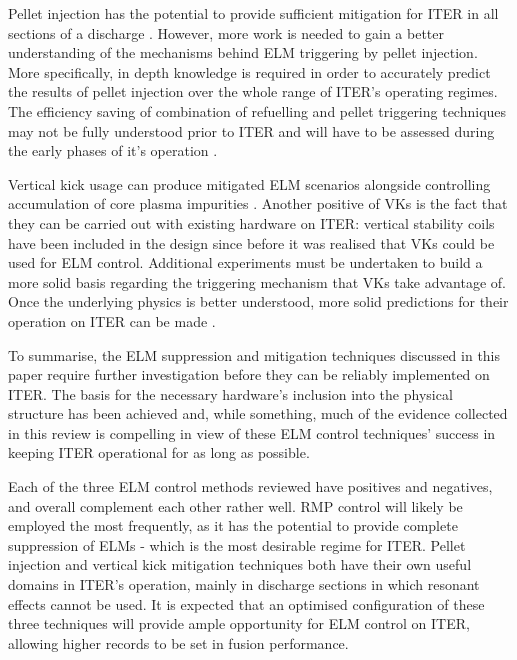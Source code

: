 \documentclass[11pt, twocolumn]{article}  %
\newcommand{\citep}[1]{\cite{#1}}
\begin{document}
Pellet injection has the potential to provide sufficient mitigation for ITER in all sections of a discharge \citep{Baylor2015}. However, more work is needed to gain a better understanding of the mechanisms behind ELM triggering by pellet injection. More specifically, in depth knowledge is required in order to accurately predict the results of pellet injection over the whole range of ITER's operating regimes. The efficiency saving of combination of refuelling and pellet triggering techniques may not be fully understood prior to ITER and will have to be assessed during the early phases of it's operation \citep{Baylor2015}.

Vertical kick usage can produce mitigated ELM scenarios alongside controlling accumulation of core plasma impurities \cite{DelaLuna2016}. Another positive of VKs is the fact that they can be carried out with existing hardware on ITER: vertical stability coils have been included in the design since before it was realised that VKs could be used for ELM control. Additional experiments must be undertaken to build a more solid basis regarding the triggering mechanism that VKs take advantage of. Once the underlying physics is better understood, more solid predictions for their operation on ITER can be made \citep{DelaLuna2016}.

To summarise, the ELM suppression and mitigation techniques discussed in this paper require further investigation before they can be reliably implemented on ITER. The basis for the necessary hardware's inclusion into the physical structure has been achieved and, while something, much of the evidence collected in this review is compelling in view of these ELM control techniques' success in keeping ITER operational for as long as possible.

Each of the three ELM control methods reviewed have positives and negatives, and overall complement each other rather well. RMP control will likely be employed the most frequently, as it has the potential to provide complete suppression of ELMs - which is the most desirable regime for ITER. Pellet injection and vertical kick mitigation techniques both have their own useful domains in ITER's operation, mainly in discharge sections in which resonant effects cannot be used. It is expected that an optimised configuration of these three techniques will provide ample opportunity for ELM control on ITER, allowing higher records to be set in fusion performance.


\printbibliography
\end{document}
